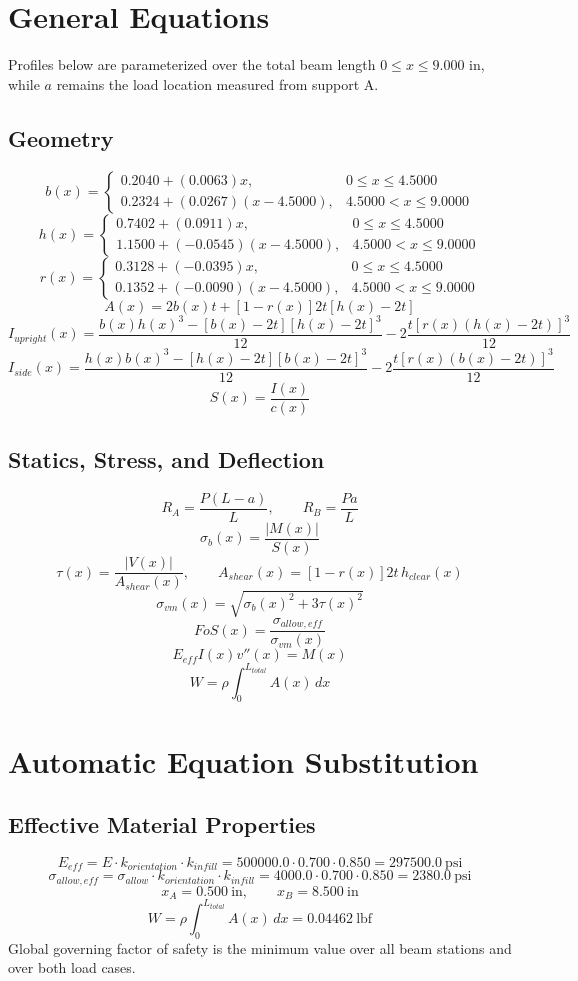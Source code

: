 \documentclass[11pt]{article}
\begin{document}
\section*{General Equations}
Profiles below are parameterized over the total beam length $0 \le x \le 9.000$ in, while $a$ remains the load location measured from support A.
\subsection*{Geometry}
\[
b(x)=\begin{cases}0.2040 + (0.0063)x, & 0 \le x \le 4.5000\\0.2324 + (0.0267)(x-4.5000), & 4.5000 < x \le 9.0000\end{cases}
\]
\[
h(x)=\begin{cases}0.7402 + (0.0911)x, & 0 \le x \le 4.5000\\1.1500 + (-0.0545)(x-4.5000), & 4.5000 < x \le 9.0000\end{cases}
\]
\[
r(x)=\begin{cases}0.3128 + (-0.0395)x, & 0 \le x \le 4.5000\\0.1352 + (-0.0090)(x-4.5000), & 4.5000 < x \le 9.0000\end{cases}
\]
\[
A(x)=2b(x)t+[1-r(x)]2t[h(x)-2t]
\]
\[
I_{upright}(x)=\frac{b(x)h(x)^3-[b(x)-2t][h(x)-2t]^3}{12}-2\frac{t[r(x)(h(x)-2t)]^3}{12}
\]
\[
I_{side}(x)=\frac{h(x)b(x)^3-[h(x)-2t][b(x)-2t]^3}{12}-2\frac{t[r(x)(b(x)-2t)]^3}{12}
\]
\[
S(x)=\frac{I(x)}{c(x)}
\]

\subsection*{Statics, Stress, and Deflection}
\[
R_A=\frac{P(L-a)}{L}, \qquad R_B=\frac{Pa}{L}
\]
\[
\sigma_b(x)=\frac{|M(x)|}{S(x)}
\]
\[
\tau(x)=\frac{|V(x)|}{A_{shear}(x)}, \qquad A_{shear}(x)=[1-r(x)]2t\,h_{clear}(x)
\]
\[
\sigma_{vm}(x)=\sqrt{\sigma_b(x)^2+3\tau(x)^2}
\]
\[
FoS(x)=\frac{\sigma_{allow,eff}}{\sigma_{vm}(x)}
\]
\[
E_{eff}I(x)v''(x)=M(x)
\]
\[
W=\rho\int_0^{L_{total}} A(x)\,dx
\]

\section*{Automatic Equation Substitution}
\subsection*{Effective Material Properties}
\[E_{eff} = E \cdot k_{orientation} \cdot k_{infill} = 500000.0 \cdot 0.700 \cdot 0.850 = 297500.0\ \mathrm{psi}\]
\[\sigma_{allow,eff} = \sigma_{allow} \cdot k_{orientation} \cdot k_{infill} = 4000.0 \cdot 0.700 \cdot 0.850 = 2380.0\ \mathrm{psi}\]
\[x_A = 0.500\ \mathrm{in}, \qquad x_B = 8.500\ \mathrm{in}\]
\[W = \rho \int_0^{L_{total}} A(x)\,dx = 0.04462\ \mathrm{lbf}\]
Global governing factor of safety is the minimum value over all beam stations and over both load cases.
\end{document}
